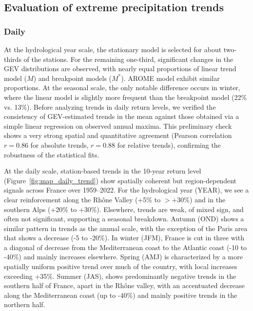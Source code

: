 \documentclass[hess, manuscript]{copernicus}
\begin{document}
\subsection{Evaluation of extreme precipitation
trends}\label{evaluation-of-extreme-precipitation-trends}

\subsubsection{Daily}

At the hydrological year scale, the stationary model is selected for about two-thirds of the stations. For the remaining one-third, significant changes in the GEV distributions are observed, with nearly equal proportions of linear trend model ($M$) and breakpoint models ($M^{*}$). AROME
model exhibit similar proportions. At the seasonal scale, the only notable difference occurs in winter, where the linear model is slightly more frequent than the breakpoint model (22\% vs. 13\%). Before analyzing trends in daily return levels, we verified the consistency of GEV-estimated trends in the mean against those obtained via a simple linear regression on observed annual maxima. This preliminary check shows a very strong spatial and quantitative agreement (Pearson correlation $r = 0.86$ for absolute trends, $r = 0.88$ for relative trends), confirming the robustness of the statistical fits.

At the daily scale, station-based trends in the 10-year return level (Figure~\ref{fig:map_daily_trend}) show spatially coherent but region-dependent signals across France over 1959--2022. For the hydrological year (YEAR), we see a clear reinforcement along the Rhône Valley (+5\% to \(>+30\%\)) and in the southern Alps (+20\% to +30\%). Elsewhere, trends are weak, of mixed sign, and often not significant, supporting a seasonal breakdown. Autumn (OND) shows a similar pattern in trends as the annual scale, with the exception of the Paris area that shows a decrease (-5 to -20\%). In winter (JFM), France is cut in three with a diagonal of decrease from the Mediterranean coast to the Atlantic coast (-10 to -40\%) and mainly increases elsewhere. Spring (AMJ) is characterized by a more spatially uniform positive trend over much of the country, with local increases exceeding +35\%. Summer (JAS), shows predominantly negative trends in the southern half of France, apart in the Rhône valley, with an accentuated decrease along the Mediterranean coast (up to -40\%) and mainly positive trends in the northern half.
\end{document}
